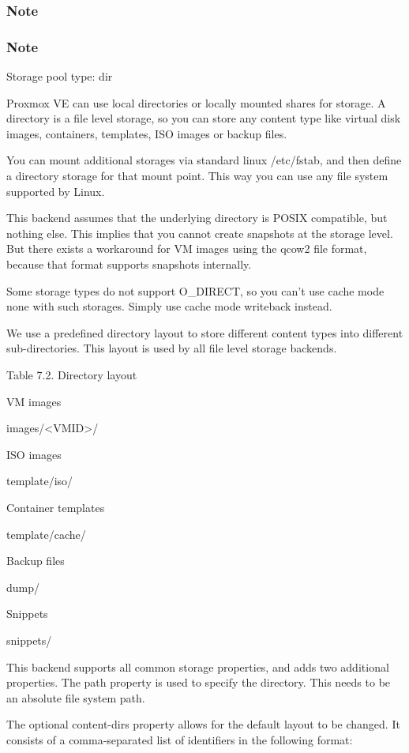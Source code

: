 \subsubsection{Note}

\subsubsection{Note}

Storage pool type: dir

Proxmox VE can use local directories or locally mounted shares for storage. A directory is a file level storage, so you can store any content type like virtual disk images, containers, templates, ISO images or backup files.

You can mount additional storages via standard linux /etc/fstab, and then define a directory storage for that mount point. This way you can use any file system supported by Linux.

This backend assumes that the underlying directory is POSIX compatible, but nothing else. This implies that you cannot create snapshots at the storage level. But there exists a workaround for VM images using the qcow2 file format, because that format supports snapshots internally.

Some storage types do not support O_DIRECT, so you can’t use cache mode none with such storages. Simply use cache mode writeback instead.

We use a predefined directory layout to store different content types into different sub-directories. This layout is used by all file level storage backends.

Table 7.2. Directory layout

VM images

images/<VMID>/

ISO images

template/iso/

Container templates

template/cache/

Backup files

dump/

Snippets

snippets/

This backend supports all common storage properties, and adds two additional properties. The path property is used to specify the directory. This needs to be an absolute file system path.

The optional content-dirs property allows for the default layout to be changed. It consists of a comma-separated list of identifiers in the following format:

